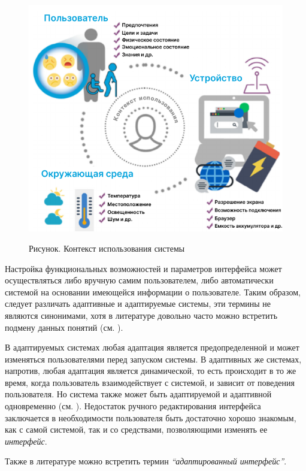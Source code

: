 \begin{figure}[H]
	\caption{Рисунок. Контекст использования системы}
	\includegraphics[scale=0.5]{author/part4/figures/user-context.png}
	\label{fig:use_context}
\end{figure}

Настройка функциональных возможностей и параметров интерфейса может осуществляться либо вручную самим пользователем, либо автоматически системой на основании имеющейся информации о пользователе. Таким образом, следует различать адаптивные и адаптируемые системы, эти термины не являются синонимами, хотя в литературе довольно часто можно встретить подмену данных понятий (см. ).

В адаптируемых системах любая адаптация является предопределенной и может изменяться пользователями перед запуском системы. В адаптивных же системах, напротив, любая адаптация является динамической, то есть происходит в то же время, когда пользователь взаимодействует с системой, и зависит от поведения пользователя. Но система также может быть адаптируемой и адаптивной одновременно (см. ).
Недостаток ручного редактирования интерфейса заключается в необходимости пользователя быть достаточно хорошо знакомым, как с самой системой, так и со средствами, позволяющими изменять ее \textit{интерфейс}.

Также в литературе можно встретить термин \textit{``адаптированный интерфейс''}. 

